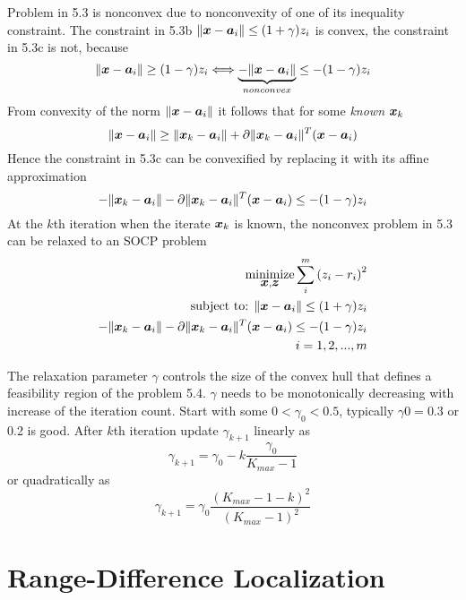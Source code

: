 Problem in 5.3 is nonconvex due to nonconvexity of one of its inequality constraint. The constraint in 5.3b $\|\mbox{\boldmath$x$} - \mbox{\boldmath$a$}_i\| \leq (1+ \gamma)z_i$ is convex, the constraint in 5.3c is not, because
\begin{equation}
\nonumber
\|\mbox{\boldmath$x$} - \mbox{\boldmath$a$}_i\| \geq (1 - \gamma)z_i \Longleftrightarrow \underbrace{-\|\mbox{\boldmath$x$} - \mbox{\boldmath$a$}_i\|}_{nonconvex} \leq -(1 - \gamma)z_i
\end{equation}
From convexity of the norm $\|\mbox{\boldmath$x$} - \mbox{\boldmath$a$}_i\|$ it follows that for some \textit{known} $\mbox{\boldmath$x$}_k$
\begin{equation}
\nonumber
\|\mbox{\boldmath$x$} - \mbox{\boldmath$a$}_i\| \geq \|\mbox{\boldmath$x$}_k - \mbox{\boldmath$a$}_i\| + \partial\|\mbox{\boldmath$x$}_k - \mbox{\boldmath$a$}_i\|^T(\mbox{\boldmath$x$} - \mbox{\boldmath$a$}_i)
\end{equation}
Hence the constraint in 5.3c can be convexified by replacing it with its affine approximation
\begin{equation}
\nonumber
-\|\mbox{\boldmath$x$}_k - \mbox{\boldmath$a$}_i\| - \partial\|\mbox{\boldmath$x$}_k - \mbox{\boldmath$a$}_i\|^T(\mbox{\boldmath$x$} - \mbox{\boldmath$a$}_i) \leq -(1 - \gamma)z_i
\end{equation}
At the $k$th iteration when the iterate $\mbox{\boldmath$x$}_k$ is known, the nonconvex problem in 5.3 can be relaxed to an SOCP problem
\begin{eqnarray} %
\Min_{\Bx, \Bz} \sum^m_i \left( z_i - r_i \right)^2 \\
\setcounter{equation}{4}
\mbox{subject to: } \|\Bx - \Ba_i\| \leq (1+ \gamma)z_i  \\
\setcounter{equation}{4}
-\|\Bx_k - \Ba_i\| - \partial\|\Bx_k - \Ba_i\|^T(\Bx - \Ba_i) \leq -(1 - \gamma)z_i \\
\nonumber
\quad i = 1, 2, ..., m
\end{eqnarray}

The relaxation parameter $\gamma$ controls the size of the convex hull that defines a feasibility region of the problem 5.4.
$\gamma$ needs to be monotonically decreasing with increase of the iteration count. Start with some $0 < \gamma_0 < 0.5$, typically $\gamma0 = 0.3$ or 0.2 is good. After $k$th iteration update $\gamma_{k+1}$ linearly as
\begin{equation}
\nonumber
\gamma_{k+1} = \gamma_0 - k\frac{\gamma_0}{K_{max} - 1}
\end{equation}
or quadratically as
\begin{equation}
\nonumber
\gamma_{k+1} = \gamma_0\frac{(K_{max} - 1 - k)^2}{(K_{max} - 1)^2}
\end{equation}


\section{Range-Difference Localization}

